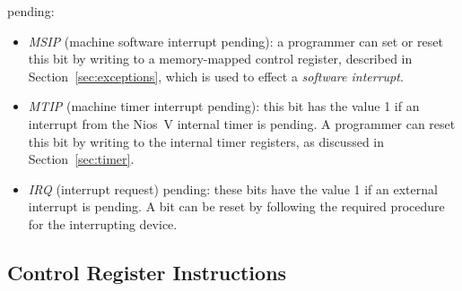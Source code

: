 \documentclass[11pt, twoside, pdftex]{article}
\begin{document}
\begin{itemize}
pending: 
\begin{itemize}
\item {\it MSIP} (machine software interrupt pending): a programmer can set or reset this
bit by writing to a memory-mapped control register, described in Section~\ref{sec:exceptions}, 
which is used to effect a {\it software interrupt}.
\item {\it MTIP} (machine timer interrupt pending): this bit has the value 1 
if an interrupt from the Nios~V internal timer is pending. A programmer can reset this bit 
by writing to the internal timer registers, as discussed in Section~\ref{sec:timer}.
\item {\it IRQ} (interrupt request) pending: these bits have the value 1 if an external
interrupt is pending. A bit can be reset by following the required procedure for the
interrupting device. 
\end{itemize}
\end{itemize}
 
\subsection{Control Register Instructions}
\label{sec:csr_inst}
\end{document}
